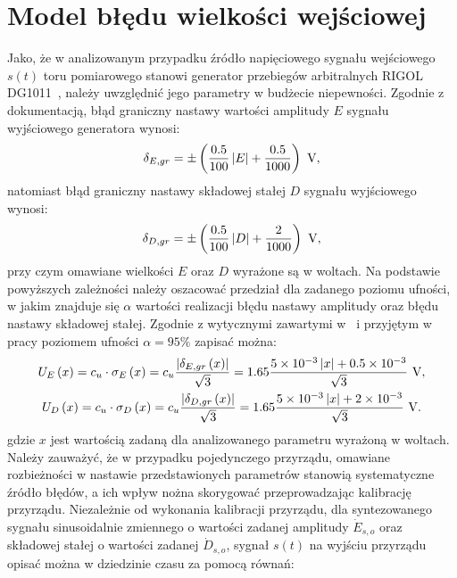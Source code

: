 \section{Model błędu wielkości wejściowej}

Jako, że w analizowanym przypadku źródło napięciowego sygnału wejściowego $s(t)$ toru pomiarowego stanowi generator przebiegów arbitralnych RIGOL DG1011~\cite{rigol_fawg}, należy uwzględnić jego parametry w budżecie niepewności. Zgodnie z dokumentacją, błąd graniczny nastawy wartości amplitudy $E$ sygnału wyjściowego generatora wynosi:
\begin{equation}
\delta_{E,gr} = \pm \emb{\frac{0.5}{100} \left| E \right| + \frac{0.5}{1000}} ~\unit{V} \label{eq:pom_gen_amperr_max},
\end{equation}
natomiast błąd graniczny nastawy składowej stałej $D$ sygnału wyjściowego wynosi:
\begin{equation}
\delta_{D,gr} = \pm \emb{\frac{0.5}{100} \left| D \right| + \frac{2}{1000}} ~\unit{V} \label{eq:pom_gen_shferr_max},
\end{equation}
przy czym omawiane wielkości $E$ oraz $D$ wyrażone są w woltach. Na podstawie powyższych zależności należy oszacować przedział dla zadanego poziomu ufności, w jakim znajduje się $\alpha$ wartości realizacji błędu nastawy amplitudy oraz błędu nastawy składowej stałej. Zgodnie z wytycznymi zawartymi w~\cite{jcgm_guide} i przyjętym w pracy poziomem ufności $\alpha = 95\%$ zapisać można:
\begin{gather}
U_{E} \emb{x} = c_{u} \cdot \sigma_{E} \emb{x} = c_{u} \frac{\left| \delta_{E,gr} \emb{x} \right|}{\sqrt{3}} = 1.65 \frac{\num{5e-3} \left| x \right| + \num{0.5e-3}}{\sqrt{3}} ~\unit{V} \label{eq:pom_gen_amperr_unc}, \\
U_{D} \emb{x} = c_{u} \cdot \sigma_{D} \emb{x} = c_{u} \frac{\left| \delta_{D,gr} \emb{x} \right|}{\sqrt{3}} = 1.65 \frac{\num{5e-3} \left| x \right| + \num{2e-3}}{\sqrt{3}} ~\unit{V} \label{eq:pom_gen_shferr_unc}.
\end{gather}
gdzie $x$ jest wartością zadaną dla analizowanego parametru wyrażoną w woltach. Należy zauważyć, że w przypadku pojedynczego przyrządu, omawiane rozbieżności w nastawie przedstawionych parametrów stanowią systematyczne źródło błędów, a ich wpływ nożna skorygować przeprowadzając kalibrację przyrządu. Niezależnie od wykonania kalibracji przyrządu, dla syntezowanego sygnału sinusoidalnie zmiennego o wartości zadanej amplitudy $\dot{E}_{s,o}$ oraz składowej stałej o wartości zadanej $\dot{D}_{s,o}$, sygnał $s(t)$ na wyjściu przyrządu opisać można w dziedzinie czasu za pomocą równań:
